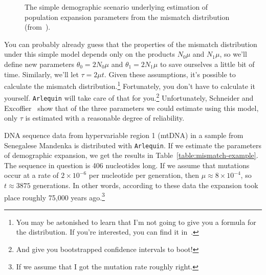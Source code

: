 \begin{figure}
\begin{center}
\end{center}
\caption{The simple demographic scenario underlying estimation of
  population expansion parameters from the mismatch distribution
  (from~\cite{Schneider-Excoffier-1999}).}\label{fig:mismatch-model}
\end{figure}

You can probably already guess that the properties of the mismatch
distribution under this simple model depends only on the products
$N_0\mu$ and $N_1\mu$, so we'll define new parameters
$\theta_0=2N_0\mu$ and $\theta_1=2N_1\mu$ to save ourselves a little
bit of time. Similarly, we'll let $\tau = 2\mu t$. Given these
assumptions, it's possible to calculate the mismatch
distribution.\footnote{You may be astonished to learn that I'm not
  going to give you a formula for the distribution. If you're
  interested, you can find it in~\cite{Schneider-Excoffier-1999}.}
Fortunately, you don't have to calculate it yourself. {\tt Arlequin}
will take care of that for you.\footnote{And give you bootstrapped
  confidence intervals to boot!} Unfortunately, Schneider and
Excoffier~\cite{Schneider-Excoffier-1999} show that of the three
parameters we could estimate using this model, only $\tau$ is
estimated with a reasonable degree of reliability.

DNA sequence data from hypervariable region 1 (mtDNA) in a sample from
Senegalese Mandenka is distributed with {\tt Arlequin}. If we estimate
the parameters of demographic expansion, we get the results in
Table~\ref{table:mismatch-example}. The sequence in question is 406
nucleotides long. If we assume that mutations occur at a rate of
$2\times 10^{-6}$ per nucleotide per generation, then $\mu \approx
8\times 10^{-4}$, so $t \approx 3875$ generations. In other words,
according to these data the expansion took place roughly 75,000 years
ago.\footnote{If we assume that I got the mutation rate roughly
  right.}

